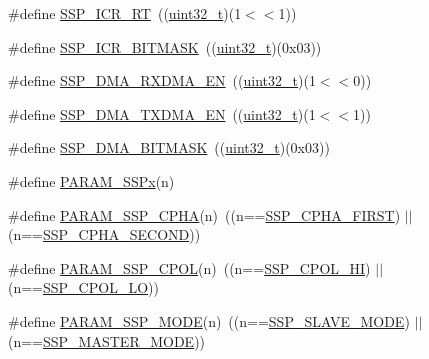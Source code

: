 \begin{DoxyCompactItemize}
\item 
\#define \hyperlink{group___s_s_p___private___macros_ga6917b6687bd6c914134afe3d86b10fb0}{S\+S\+P\+\_\+\+I\+C\+R\+\_\+\+RT}~((\hyperlink{_p_e___types_8h_a33594304e786b158f3fb30289278f5af}{uint32\+\_\+t})(1$<$$<$1))
\item 
\#define \hyperlink{group___s_s_p___private___macros_ga5ce108586bfd5b77c849aa9969c8973c}{S\+S\+P\+\_\+\+I\+C\+R\+\_\+\+B\+I\+T\+M\+A\+SK}~((\hyperlink{_p_e___types_8h_a33594304e786b158f3fb30289278f5af}{uint32\+\_\+t})(0x03))
\item 
\#define \hyperlink{group___s_s_p___private___macros_ga0508ccc6f92325452fb24fa4d7a4c202}{S\+S\+P\+\_\+\+D\+M\+A\+\_\+\+R\+X\+D\+M\+A\+\_\+\+EN}~((\hyperlink{_p_e___types_8h_a33594304e786b158f3fb30289278f5af}{uint32\+\_\+t})(1$<$$<$0))
\item 
\#define \hyperlink{group___s_s_p___private___macros_gaafe065e1865ad37d436c5f000f9653ab}{S\+S\+P\+\_\+\+D\+M\+A\+\_\+\+T\+X\+D\+M\+A\+\_\+\+EN}~((\hyperlink{_p_e___types_8h_a33594304e786b158f3fb30289278f5af}{uint32\+\_\+t})(1$<$$<$1))
\item 
\#define \hyperlink{group___s_s_p___private___macros_ga7ba88e5e9bd61c60806ce262fcc8838a}{S\+S\+P\+\_\+\+D\+M\+A\+\_\+\+B\+I\+T\+M\+A\+SK}~((\hyperlink{_p_e___types_8h_a33594304e786b158f3fb30289278f5af}{uint32\+\_\+t})(0x03))
\item 
\#define \hyperlink{group___s_s_p___private___macros_ga432c9213e5328a9ebefa11f6bc161ca3}{P\+A\+R\+A\+M\+\_\+\+S\+S\+Px}(n)
\item 
\#define \hyperlink{group___s_s_p___private___macros_ga7930ba703ed262731feec2cc68a2b595}{P\+A\+R\+A\+M\+\_\+\+S\+S\+P\+\_\+\+C\+P\+HA}(n)~((n==\hyperlink{group___s_s_p___public___macros_ga6333b5eaf9d5301431fc0399c0d417d5}{S\+S\+P\+\_\+\+C\+P\+H\+A\+\_\+\+F\+I\+R\+ST}) $\vert$$\vert$ (n==\hyperlink{group___s_s_p___public___macros_ga04ad38295445819979f55503eed5c177}{S\+S\+P\+\_\+\+C\+P\+H\+A\+\_\+\+S\+E\+C\+O\+ND}))
\item 
\#define \hyperlink{group___s_s_p___private___macros_gae8e93c95432b38bef8df82680eb91f11}{P\+A\+R\+A\+M\+\_\+\+S\+S\+P\+\_\+\+C\+P\+OL}(n)~((n==\hyperlink{group___s_s_p___public___macros_gaf64aec37a92ca6c14c23af6fc0052ccb}{S\+S\+P\+\_\+\+C\+P\+O\+L\+\_\+\+HI}) $\vert$$\vert$ (n==\hyperlink{group___s_s_p___public___macros_ga1e10eccdb2b293607764028aab1b98a9}{S\+S\+P\+\_\+\+C\+P\+O\+L\+\_\+\+LO}))
\item 
\#define \hyperlink{group___s_s_p___private___macros_gaa48648b1c2e39b0b23336a278af973cf}{P\+A\+R\+A\+M\+\_\+\+S\+S\+P\+\_\+\+M\+O\+DE}(n)~((n==\hyperlink{group___s_s_p___public___macros_gac6bc4b92810caa934b2d7116390098c6}{S\+S\+P\+\_\+\+S\+L\+A\+V\+E\+\_\+\+M\+O\+DE}) $\vert$$\vert$ (n==\hyperlink{group___s_s_p___public___macros_ga3c9cbd4f4b8169253d26f4d40cdc414d}{S\+S\+P\+\_\+\+M\+A\+S\+T\+E\+R\+\_\+\+M\+O\+DE}))

\end{DoxyCompactItemize}
